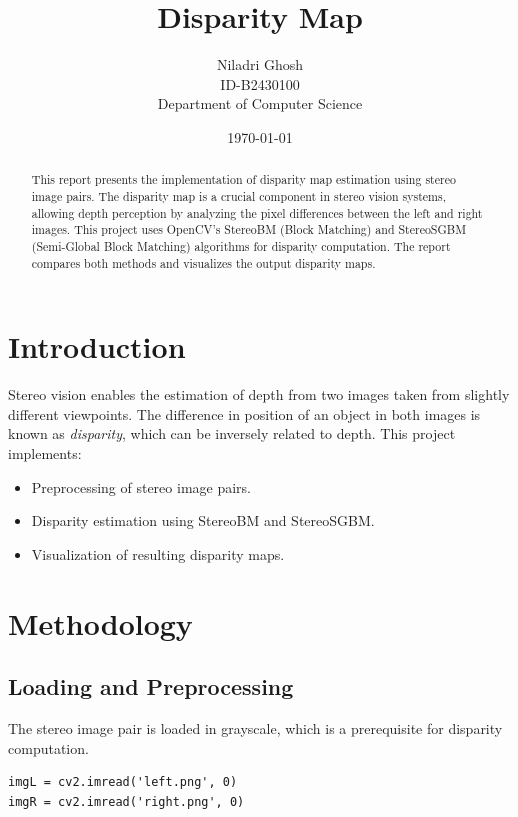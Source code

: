 \documentclass[12pt]{article}
\title{\textbf{Disparity Map}}
\author{Niladri Ghosh \\
ID-B2430100 \\
Department of Computer Science }
\date{\today}
\begin{document}
\maketitle

\begin{abstract}
This report presents the implementation of disparity map estimation using stereo image pairs. The disparity map is a crucial component in stereo vision systems, allowing depth perception by analyzing the pixel differences between the left and right images. This project uses OpenCV's StereoBM (Block Matching) and StereoSGBM (Semi-Global Block Matching) algorithms for disparity computation. The report compares both methods and visualizes the output disparity maps.
\end{abstract}

\section{Introduction}
Stereo vision enables the estimation of depth from two images taken from slightly different viewpoints. The difference in position of an object in both images is known as \textit{disparity}, which can be inversely related to depth. This project implements:
\begin{itemize}
    \item Preprocessing of stereo image pairs.
    \item Disparity estimation using StereoBM and StereoSGBM.
    \item Visualization of resulting disparity maps.
\end{itemize}

\section{Methodology}

\subsection{Loading and Preprocessing}
The stereo image pair is loaded in grayscale, which is a prerequisite for disparity computation.

\begin{verbatim}
imgL = cv2.imread('left.png', 0)
imgR = cv2.imread('right.png', 0)
\end{verbatim}
\end{document}
